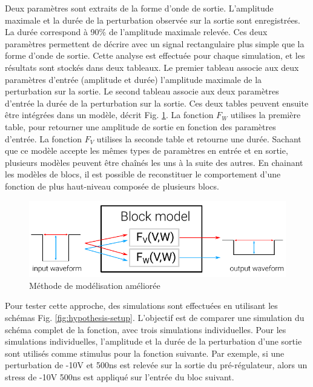 Deux paramètres sont extraits de la forme d'onde de sortie.
L'amplitude maximale et la durée de la perturbation observée sur la sortie sont enregistrées.
La durée correspond à 90\% de l'amplitude maximale relevée.
Ces deux paramètres permettent de décrire avec un signal rectangulaire plus simple que la forme d'onde de sortie.
Cette analyse est effectuée pour chaque simulation, et les résultats sont stockés dans deux tableaux.
Le premier tableau associe aux deux paramètres d'entrée (amplitude et durée) l'amplitude maximale de la perturbation sur la sortie.
Le second tableau associe aux deux paramètres d'entrée la durée de la perturbation sur la sortie.
Ces deux tables peuvent ensuite être intégrées dans un modèle, décrit Fig. \ref{fig:principle-transfert-func-v2}.
La fonction $F_{W}$ utilises la première table, pour retourner une amplitude de sortie en fonction des paramètres d'entrée.
La fonction $F_{V}$ utilises la seconde table et retourne une durée.
Sachant que ce modèle accepte les mêmes types de paramètres en entrée et en sortie, plusieurs modèles peuvent être chaînés les uns à la suite des autres.
En chainant les modèles de blocs, il est possible de reconstituer le comportement d'une fonction de plus haut-niveau composée de plusieurs blocs.

\begin{figure}[!h]
  \centering
  \includegraphics{src/1/figures/principle_transfert_function_v2.pdf}
  \caption{Méthode de modélisation améliorée}
  \label{fig:principle-transfert-func-v2}
\end{figure}

Pour tester cette approche, des simulations sont effectuées en utilisant les schémas Fig. \ref{fig:hypothesis-setup}.
L'objectif est de comparer une simulation du schéma complet de la fonction, avec trois simulations individuelles.
Pour les simulations individuelles, l'amplitude et la durée de la perturbation d'une sortie sont utilisés comme stimulus pour la fonction suivante.
Par exemple, si une perturbation de -10V et 500ns est relevée sur la sortie du pré-régulateur, alors un stress de -10V 500ns est appliqué sur l'entrée du bloc suivant.

